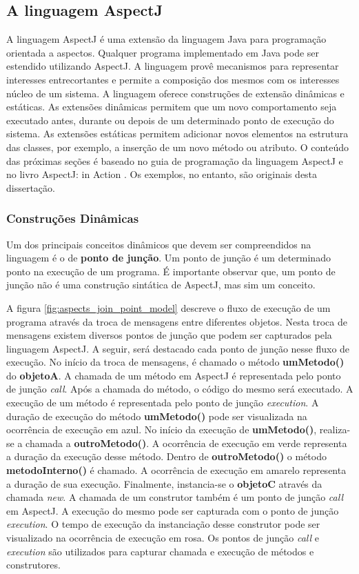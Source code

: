 \subsection{A linguagem AspectJ}

A linguagem AspectJ \cite{AspectJ11} é uma extensão da linguagem Java para programação orientada a aspectos. Qualquer programa implementado em Java
pode ser estendido utilizando AspectJ. A linguagem provê mecanismos para representar interesses entrecortantes e permite a composição dos mesmos com os interesses 
núcleo de um sistema. A linguagem oferece construções de extensão dinâmicas e estáticas. As extensões dinâmicas permitem que um novo comportamento
seja executado antes, durante ou depois de um determinado ponto de execução do sistema. As extensões estáticas permitem adicionar novos elementos na
estrutura das classes, por exemplo, a inserção de um novo método ou atributo. O conteúdo das próximas seções é baseado no guia de programação da
linguagem AspectJ \cite{aspectjguide} e no livro AspectJ: in Action \cite{Laddad:2003:AAP:993468}. Os exemplos, no entanto, são originais desta
dissertação.

\subsubsection{Construções Dinâmicas}

Um dos principais conceitos dinâmicos que devem ser compreendidos na linguagem é o de \textbf{ponto de junção}. Um ponto de junção é um determinado
ponto na execução de um programa. É importante observar que, um ponto de junção não é uma construção sintática de AspectJ, mas sim um conceito. 

A figura \ref{fig:aspects_join_point_model} descreve o fluxo de execução de um programa através da troca de mensagens entre diferentes objetos. Nesta
troca de mensagens existem diversos pontos de junção que podem ser capturados pela linguagem AspectJ. A seguir, será destacado cada ponto de junção
nesse fluxo de execução. No início da troca de mensagens, é chamado o método \textbf{umMetodo()} do \textbf{objetoA}. A chamada de um método em
AspectJ é representada pelo ponto de junção \textit{call}. Após a chamada do método, o código do mesmo será executado. A execução de um método é
representada pelo ponto de junção \textit{execution}. A duração de execução do método \textbf{umMetodo()} pode ser visualizada na ocorrência de
execução em azul. No início da execução de \textbf{umMetodo()}, realiza-se a chamada a \textbf{outroMetodo()}. A ocorrência de execução em verde
representa a duração da execução desse método. Dentro de \textbf{outroMetodo()} o método \textbf{metodoInterno()} é chamado. A ocorrência de execução em 
amarelo representa a duração de sua execução. Finalmente, instancia-se o \textbf{objetoC} através da chamada \textit{new}. A chamada de um construtor
também é um ponto de junção \textit{call} em AspectJ. A execução do mesmo pode ser capturada com o ponto de junção \textit{execution}. O tempo de
execução da instanciação desse construtor pode ser visualizado na ocorrência de execução em rosa. Os pontos de junção \textit{call} e
\textit{execution} são utilizados para capturar chamada e execução de métodos e construtores. 

